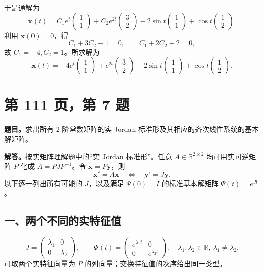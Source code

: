 \documentclass[11pt,a4paper]{ctexart}
\newcommand{\xx}{\boldsymbol{x}}
\begin{document}
于是通解为
\[
\xx(t)=C_1e^t\begin{pmatrix}1\\1\end{pmatrix}
+C_2e^{2t}\begin{pmatrix}3\\2\end{pmatrix}
-2\sin t\begin{pmatrix}1\\1\end{pmatrix}
+\cos t\begin{pmatrix}1\\2\end{pmatrix}.
\]
利用 $\xx(0)=0$，得
\[
C_1+3C_2+1=0,\qquad C_1+2C_2+2=0,
\]
故 $C_1=-4,C_2=1$。所求解为
\[
\boxed{\xx(t)=-4e^t\begin{pmatrix}1\\1\end{pmatrix}
+e^{2t}\begin{pmatrix}3\\2\end{pmatrix}
-2\sin t\begin{pmatrix}1\\1\end{pmatrix}
+\cos t\begin{pmatrix}1\\2\end{pmatrix}.}
\]

\newpage
\section*{第 111 页，第 7 题}
\textbf{题目。}求出所有 2 阶常数矩阵的实 Jordan 标准形及其相应的齐次线性系统的基本解矩阵。

\textbf{解答。}按实矩阵理解题中的“实 Jordan 标准形”。任意 $A\in\mathbb R^{2\times2}$ 均可用实可逆矩阵 $P$ 化成 $A=PJP^{-1}$。令 $\xx=P\boldsymbol{y}$，则
\[
\xx'=A\xx\quad\Longleftrightarrow\quad \boldsymbol{y}'=J\boldsymbol{y}.
\]
以下逐一列出所有可能的 $J$，以及满足 $\Psi(0)=I$ 的标准基本解矩阵 $\Psi(t)=e^{Jt}$。

\subsection*{一、两个不同的实特征值}
\[
\boxed{J=\begin{pmatrix}\lambda_1&0\\0&\lambda_2\end{pmatrix},\qquad
\Psi(t)=\begin{pmatrix}e^{\lambda_1t}&0\\0&e^{\lambda_2t}\end{pmatrix},
\quad \lambda_1,\lambda_2\in\mathbb R,\ \lambda_1\ne\lambda_2.}
\]
可取两个实特征向量为 $P$ 的列向量；交换特征值的次序给出同一类型。
\end{document}
